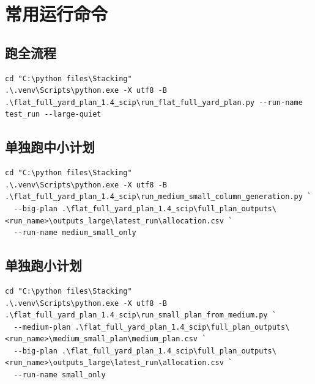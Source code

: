 \documentclass[UTF8,fontset=windows,zihao=-4]{ctexart}
\begin{document}
\section{常用运行命令}

\subsection{跑全流程}

\begin{Verbatim}[fontsize=\small,breaklines=true,breakanywhere=true]
cd "C:\python files\Stacking"
.\.venv\Scripts\python.exe -X utf8 -B .\flat_full_yard_plan_1.4_scip\run_flat_full_yard_plan.py --run-name test_run --large-quiet
\end{Verbatim}

\subsection{单独跑中小计划}

\begin{Verbatim}[fontsize=\small,breaklines=true,breakanywhere=true]
cd "C:\python files\Stacking"
.\.venv\Scripts\python.exe -X utf8 -B .\flat_full_yard_plan_1.4_scip\run_medium_small_column_generation.py `
  --big-plan .\flat_full_yard_plan_1.4_scip\full_plan_outputs\<run_name>\outputs_large\latest_run\allocation.csv `
  --run-name medium_small_only
\end{Verbatim}

\subsection{单独跑小计划}

\begin{Verbatim}[fontsize=\small,breaklines=true,breakanywhere=true]
cd "C:\python files\Stacking"
.\.venv\Scripts\python.exe -X utf8 -B .\flat_full_yard_plan_1.4_scip\run_small_plan_from_medium.py `
  --medium-plan .\flat_full_yard_plan_1.4_scip\full_plan_outputs\<run_name>\medium_small_plan\medium_plan.csv `
  --big-plan .\flat_full_yard_plan_1.4_scip\full_plan_outputs\<run_name>\outputs_large\latest_run\allocation.csv `
  --run-name small_only
\end{Verbatim}
\end{document}

